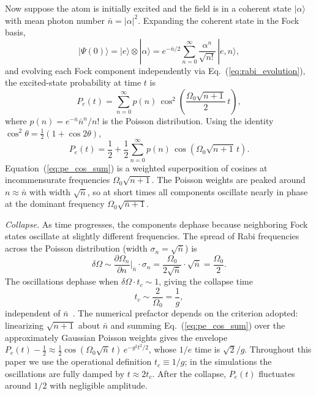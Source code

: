 \documentclass[12pt]{iopart}
\begin{document}
Now suppose the atom is initially excited and the field is in a coherent state $|\alpha\rangle$ with mean photon number $\bar{n} = |\alpha|^2$. Expanding the coherent state in the Fock basis,
\begin{equation}
|\Psi(0)\rangle = |e\rangle \otimes |\alpha\rangle = e^{-\bar{n}/2}\sum_{n=0}^{\infty} \frac{\alpha^n}{\sqrt{n!}}\,|e, n\rangle,
\end{equation}
and evolving each Fock component independently via Eq.~(\ref{eq:rabi_evolution}), the excited-state probability at time $t$ is
\begin{equation}
P_e(t) = \sum_{n=0}^{\infty} p(n)\,\cos^2\!\left(\frac{\Omega_0\sqrt{n+1}}{2}\,t\right),
\label{eq:pe_coherent}
\end{equation}
where $p(n) = e^{-\bar{n}}\bar{n}^n/n!$ is the Poisson distribution. Using the identity $\cos^2\theta = \tfrac{1}{2}(1 + \cos 2\theta)$,
\begin{equation}
P_e(t) = \frac{1}{2} + \frac{1}{2}\sum_{n=0}^{\infty} p(n)\,\cos\!\left(\Omega_0\sqrt{n+1}\,t\right).
\label{eq:pe_cos_sum}
\end{equation}
Equation~(\ref{eq:pe_cos_sum}) is a weighted superposition of cosines at incommensurate frequencies $\Omega_0\sqrt{n+1}$. The Poisson weights are peaked around $n \approx \bar{n}$ with width $\sqrt{\bar{n}}$, so at short times all components oscillate nearly in phase at the dominant frequency $\Omega_0\sqrt{\bar{n}+1}$.

\textit{Collapse.} As time progresses, the components dephase because neighboring Fock states oscillate at slightly different frequencies. The spread of Rabi frequencies across the Poisson distribution (width $\sigma_n = \sqrt{\bar{n}}$) is
\begin{equation}
\delta\Omega \sim \frac{\partial\Omega_n}{\partial n}\bigg|_{\bar{n}} \cdot \sigma_n = \frac{\Omega_0}{2\sqrt{\bar{n}}} \cdot \sqrt{\bar{n}} = \frac{\Omega_0}{2}.
\end{equation}
The oscillations dephase when $\delta\Omega \cdot t_c \sim 1$, giving the collapse time
\begin{equation}
t_c \sim \frac{2}{\Omega_0} = \frac{1}{g},
\label{eq:t_collapse}
\end{equation}
independent of $\bar{n}$~\cite{eberly1980}. The numerical prefactor depends on the criterion adopted: linearizing $\sqrt{n+1}$ about $\bar{n}$ and summing Eq.~(\ref{eq:pe_cos_sum}) over the approximately Gaussian Poisson weights gives the envelope $P_e(t) - \tfrac{1}{2} \approx \tfrac{1}{2}\cos(\Omega_0\sqrt{\bar{n}}\,t)\,e^{-g^2t^2/2}$, whose $1/e$ time is $\sqrt{2}/g$. Throughout this paper we use the operational definition $t_c \equiv 1/g$; in the simulations the oscillations are fully damped by $t \approx 2t_c$. After the collapse, $P_e(t)$ fluctuates around $1/2$ with negligible amplitude.
\end{document}
